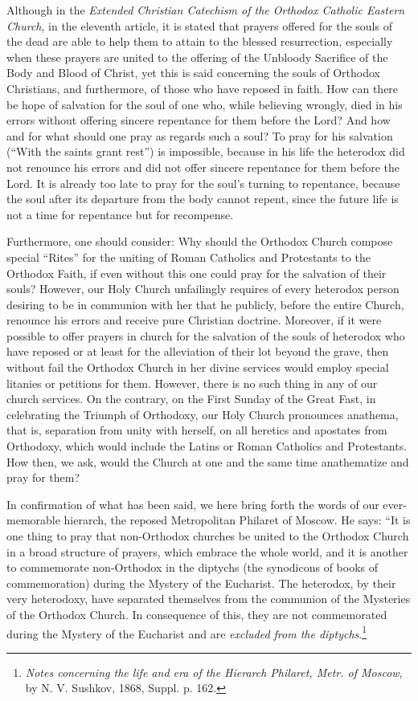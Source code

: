 Although in the \textit{Extended Christian Catechism of the Orthodox Catholic Eastern Church}, in the eleventh article, it is stated that prayers offered for the souls of the dead are able to help them to attain to the blessed resurrection, especially when these prayers are united to the offering of the Unbloody Sacrifice of the Body and Blood of Christ, yet this is said concerning the souls of Orthodox Christians, and furthermore, of those who have reposed in faith. How can there be hope of salvation for the soul of one who, while believing wrongly, died in his errors without offering sincere repentance for them before the Lord? And how and for what should one pray as regards such a soul? To pray for his salvation (“With the saints grant rest”) is impossible, because in his life the heterodox did not renounce his errors and did not offer sincere repentance for them before the Lord. It is already too late to pray for the soul's turning to repentance, because the soul after its departure from the body cannot repent, since the future life is not a time for repentance but for recompense.

Furthermore, one should consider: Why should the Orthodox Church compose special “Rites” for the uniting of Roman Catholics and Protestants to the Orthodox Faith, if even without this one could pray for the salvation of their souls? However, our Holy Church unfailingly requires of every heterodox person desiring to be in communion with her that he publicly, before the entire Church, renounce his errors and receive pure Christian doctrine. Moreover, if it were possible to offer prayers in church for the salvation of the souls of heterodox who have reposed or at least for the alleviation of their lot beyond the grave, then without fail the Orthodox Church in her divine services would employ special litanies or petitions for them. However, there is no such thing in any of our church services. On the contrary, on the First Sunday of the Great Fast, in celebrating the Triumph of Orthodoxy, our Holy Church pronounces anathema, that is, separation from unity with herself, on all heretics and apostates from Orthodoxy, which would include the Latins or Roman Catholics and Protestants. How then, we ask, would the Church at one and the same time anathematize and pray for them?

In confirmation of what has been said, we here bring forth the words of our ever-memorable hierarch, the reposed Metropolitan Philaret of Moscow. He says: “It is one thing to pray that non-Orthodox churches be united to the Orthodox Church in a broad structure of prayers, which embrace the whole world, and it is another to commemorate non-Orthodox in the diptychs (the synodicons of books of commemoration) during the Mystery of the Eucharist. The heterodox, by their very heterodoxy, have separated themselves from the communion of the Mysteries of the Orthodox Church. In consequence of this, they are not commemorated during the Mystery of the Eucharist and are \textit{excluded from the diptychs}.\footnote{\textit{Notes concerning the life and era of the Hierarch Philaret, Metr. of Moscow}, by N. V. Sushkov, 1868, Suppl. p. 162.}

